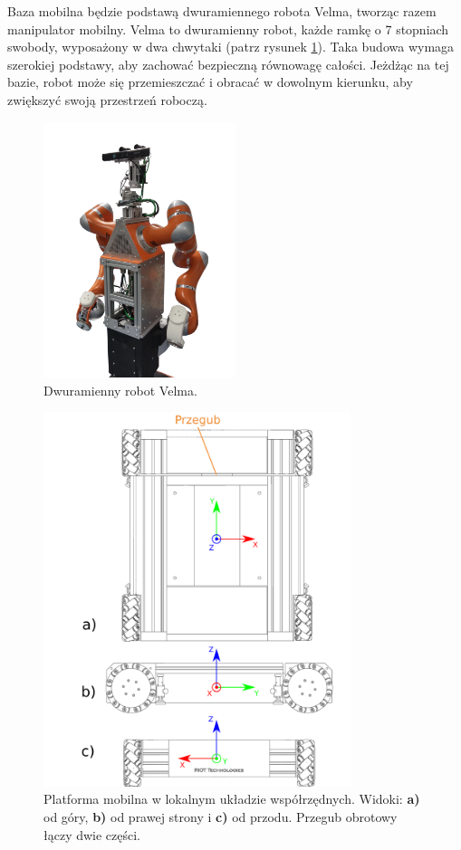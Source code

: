 	Baza mobilna będzie podstawą dwuramiennego robota Velma, tworząc razem manipulator mobilny.
	Velma to dwuramienny robot, każde ramkę o 7 stopniach swobody, wyposażony w dwa chwytaki (patrz rysunek \ref{fig:velma}).
	Taka budowa wymaga szerokiej podstawy, aby zachować bezpieczną równowagę całości.
	Jeżdżąc na tej bazie, robot może się przemieszczać i obracać w dowolnym kierunku, aby zwiększyć swoją przestrzeń roboczą.

	\begin{figure}[H]
	\centering
	\includegraphics[width=0.5\textwidth]{graphics/velma.png}
	\caption{Dwuramienny robot Velma.}
	\label{fig:velma}
	\end{figure} 
	
	\begin{figure}[h]
		\centering
		\includegraphics[width=0.8\textwidth]{graphics/base.pdf}
		\caption{Platforma mobilna w lokalnym układzie współrzędnych. Widoki: \textbf{a)} od góry, \textbf{b)} od prawej strony i \textbf{c)} od przodu. Przegub obrotowy łączy dwie części.}
		\label{fig:base_ortho}
	\end{figure} 

